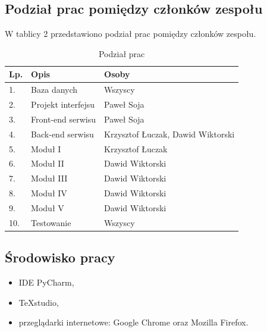 \documentclass[12pt, titlepage]{article}
\begin{document}
	\subsection{Podział prac pomiędzy członków zespołu}
	W tablicy 2 przedstawiono podział prac pomiędzy członków zespołu.
	\begin{table}[H]
		\setlength\extrarowheight{5pt}
		\centering
		\caption{Podział prac}
		\label{podzial_prac}
		\begin{tabular}{ | C{2cm} | C{6cm} | C{8cm} | }
			\hline
			\textbf{Lp.} &	\textbf{Opis} &	\textbf{Osoby} \\ \hline
			1.	&	Baza danych			&	Wszyscy \\ \hline
			2.	&	Projekt interfejsu	&	Paweł Soja \\ \hline
			3.	&	Front-end serwisu	&	Paweł Soja \\ \hline
			4.	&	Back-end serwisu	&	Krzysztof Łuczak, Dawid Wiktorski \\ \hline
			5.	&	Moduł I				&	Krzysztof Łuczak \\ \hline
			6.	&	Moduł II			&	Dawid Wiktorski \\ \hline
			7.	&	Moduł III			&	Dawid Wiktorski \\ \hline
			8.	&	Moduł IV			&	Dawid Wiktorski \\ \hline
			9.	&	Moduł V			&	Dawid Wiktorski \\ \hline
			10.	&	Testowanie			&	Wszyscy \\ \hline
		\end{tabular}
	\end{table}

	\subsection{Środowisko pracy}
	\begin{itemize}
		\item IDE PyCharm,
		\item TeXstudio,
		\item przeglądarki internetowe: Google Chrome oraz Mozilla Firefox.
	\end{itemize}
	\newpage
\end{document}

